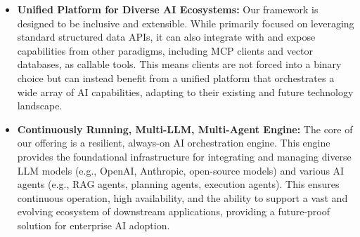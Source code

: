 \documentclass[10pt, a4paper]{article}
\begin{document}
\begin{itemize}
    \item \textbf{Unified Platform for Diverse AI Ecosystems:} Our framework is designed to be inclusive and extensible. While primarily focused on leveraging standard structured data APIs, it can also integrate with and expose capabilities from other paradigms, including MCP clients and vector databases, as callable tools. This means clients are not forced into a binary choice but can instead benefit from a unified platform that orchestrates a wide array of AI capabilities, adapting to their existing and future technology landscape.
    \item \textbf{Continuously Running, Multi-LLM, Multi-Agent Engine:} The core of our offering is a resilient, always-on AI orchestration engine. This engine provides the foundational infrastructure for integrating and managing diverse LLM models (e.g., OpenAI, Anthropic, open-source models) and various AI agents (e.g., RAG agents, planning agents, execution agents). This ensures continuous operation, high availability, and the ability to support a vast and evolving ecosystem of downstream applications, providing a future-proof solution for enterprise AI adoption.
\end{itemize}
\end{document}
